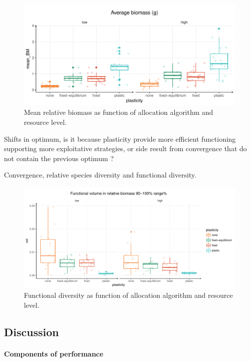 \begin{figure}\label{fig:mean_BM_pl}
\includegraphics[width = \textwidth]{./2_PP/Figures/Landscape/plot_BM_allocation.pdf}
\caption{Mean relative biomass as function of allocation algorithm and resource level.}
\end{figure}

Shifts in optimum, is it because plasticity provide more efficient functioning supporting more exploitative strategies, or side result from convergence that do not contain the previous optimum ?

Convergence, relative species diversity and functional diversity.

\begin{figure}\label{fig:function_div}
\includegraphics[width = \textwidth]{./2_PP/Figures/Landscape/plot_fdiv.pdf}
\caption{Functional diversity as function of allocation algorithm and resource level.}
\end{figure}




\subsection{Discussion}

\paragraph{Components of performance}

